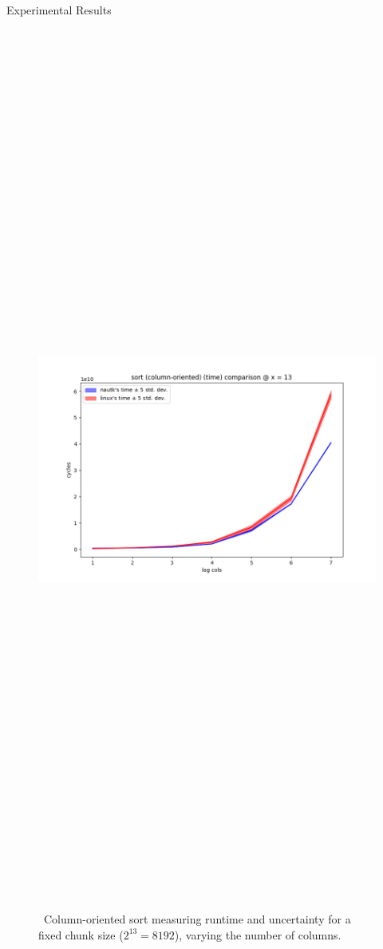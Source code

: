 \begin{block}{Experimental Results}
  \begin{figure}
    \includegraphics[height=30cm]{plots/sort.png}
    \caption{~Column-oriented sort measuring runtime and uncertainty for a fixed chunk size ($2^13 = 8192$), varying the number of columns.}
    \label{fig:sort}
  \end{figure}


\end{block}
